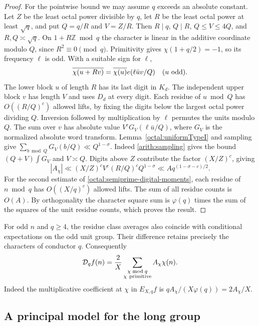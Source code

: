 \documentclass[11pt,a4paper]{article}
\theoremstyle{paperplain}
\numberwithin{equation}{section}
\begin{document}
\begin{proof}
For the pointwise bound we may assume \(q\) exceeds an absolute
constant. Let \(Z\) be the least octal power divisible by \(q\),
let \(R\) be the least octal power at least \(\sqrt q\), and put
\(Q=q/R\) and \(V=Z/R\). Then \(R\mid q\), \(Q\mid R\),
\(Q\le V\le4Q\), and \(R,Q\asymp\sqrt q\). On \(1+R\mathbb Z\bmod q\)
the character is linear in the additive coordinate modulo \(Q\),
since \(R^2\equiv0\pmod q\). Primitivity gives
\(\chi(1+q/2)=-1\), so its frequency \(\ell\) is odd. With a
suitable sign for \(\ell\),
\[
 \overline{\chi(u+Rv)}=\overline{\chi(u)}e(\ell\bar u v/Q)
 \quad(u\ {\rm odd}).
\]
The lower block \(u\) of length \(R\) has its last digit in $K_d$.
The independent upper block \(v\) has length \(V\) and uses $D_d$
at every digit. Each residue of \(u\bmod Q\)
has \(O((R/Q)^c)\) allowed lifts, by fixing the digits below the
largest octal power dividing \(Q\). Inversion followed by
multiplication by \(\ell\) permutes the units modulo \(Q\).
The sum over \(v\) has absolute value \(V^cG_V(\ell\bar u/Q)\),
where \(G_V\) is the normalized absolute word transform.
Lemma~\ref{octal:uniformTypeI} and sampling give
\(\sum_{b\bmod Q}G_V(b/Q)\ll Q^{1-\sigma}\). Indeed \eqref{arith:sampling} gives the bound $(Q+V)\int G_V$
and $V\asymp Q$.
Digits above \(Z\) contribute the factor \((X/Z)^c\), giving
\[
 |A_\chi|\ll (X/Z)^c V^c(R/Q)^c Q^{1-\sigma}
       \ll A q^{(1-\sigma-c)/2}.
\]
For the second estimate of \eqref{octal:semiprime-digital-moments},
each residue of \(n\bmod q\) has \(O((X/q)^c)\) allowed lifts.
The sum of all residue counts is \(O(A)\). By orthogonality the
character square sum is \(\varphi(q)\) times the sum of the squares
of the unit residue counts, which proves the result.
\end{proof}


For odd \(n\) and \(q\ge4\), the residue class averages also coincide
with conditional expectations on the odd unit group. Their
difference retains precisely the characters of conductor \(q\).
Consequently
\begin{equation}\label{octal:dyadic-char-expansion}
 \mathcal D_q f(n)=\frac2X
      \sum_{\substack{\chi\bmod q\\\chi\ {\rm primitive}}}
                     A_\chi\chi(n).
\end{equation}
Indeed the multiplicative coefficient at \(\chi\) in \(E_{X,q}f\)
is \(q A_\chi/(X\varphi(q))=2A_\chi/X\).


\subsection{A principal model for the long group}
\label{sec:principal-grouped-models}
\end{document}
